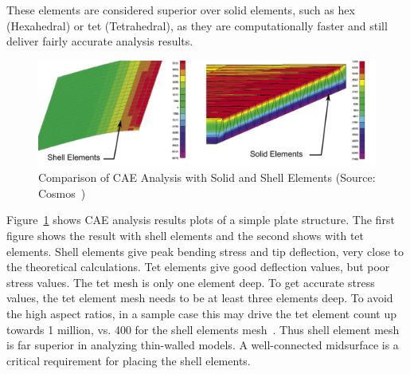 These elements are considered superior over solid elements, such as hex (Hexahedral) or tet (Tetrahedral), as they are computationally faster and still deliver fairly accurate analysis results. 

\begin{figure} [!h]
\centering
\includegraphics[width=0.95\linewidth]{..//Common/images/solidshelldesk.pdf}
\caption{Comparison of CAE Analysis with Solid and Shell Elements (Source: Cosmos~\cite{Cosmos2006})}
\label{fig:introduction:solidshell}
\end{figure}
	

Figure~\ref{fig:introduction:solidshell}  shows CAE analysis results plots of a simple plate structure. The first figure shows the result with shell elements and the second shows with tet elements. Shell elements give peak bending stress and tip deflection, very close to the theoretical calculations. Tet elements give good deflection values, but poor stress values. The tet mesh is only one element deep. To get accurate stress values, the tet element mesh needs to be at least three elements deep. To avoid the high aspect ratios, in a sample case this may drive the tet element count up towards 1 million, vs. 400 for the shell elements mesh~\cite{Abbey2013}. Thus shell element mesh is far superior in analyzing thin-walled models. A well-connected midsurface is a critical requirement for placing the shell elements.

